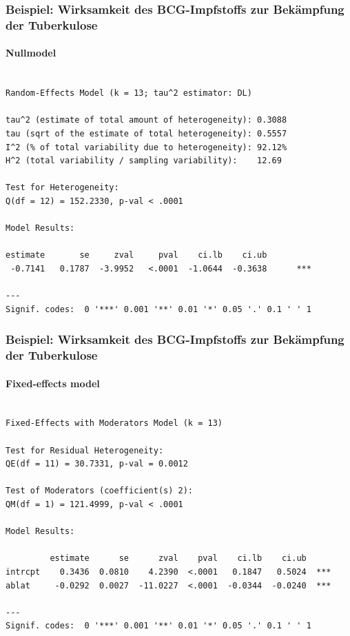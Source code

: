 \begin{frame}[fragile]
  \frametitle{Beispiel: Wirksamkeit des BCG-Impfstoffs zur Bekämpfung der
    Tuberkulose} \framesubtitle{Nullmodel}

\begin{tiny}
\begin{knitrout}
\color{fgcolor}\begin{kframe}
\begin{verbatim}

Random-Effects Model (k = 13; tau^2 estimator: DL)

tau^2 (estimate of total amount of heterogeneity): 0.3088
tau (sqrt of the estimate of total heterogeneity): 0.5557
I^2 (% of total variability due to heterogeneity): 92.12%
H^2 (total variability / sampling variability):    12.69

Test for Heterogeneity: 
Q(df = 12) = 152.2330, p-val < .0001

Model Results:

estimate       se     zval     pval    ci.lb    ci.ub          
 -0.7141   0.1787  -3.9952   <.0001  -1.0644  -0.3638      *** 

---
Signif. codes:  0 '***' 0.001 '**' 0.01 '*' 0.05 '.' 0.1 ' ' 1 
\end{verbatim}
\end{kframe}
\end{knitrout}

\end{tiny}
\end{frame}


\begin{frame}[fragile]
  \frametitle{Beispiel: Wirksamkeit des BCG-Impfstoffs zur Bekämpfung der
    Tuberkulose} \framesubtitle{Fixed-effects model}

\begin{tiny}
\begin{knitrout}
\color{fgcolor}\begin{kframe}
\begin{verbatim}

Fixed-Effects with Moderators Model (k = 13)

Test for Residual Heterogeneity: 
QE(df = 11) = 30.7331, p-val = 0.0012

Test of Moderators (coefficient(s) 2): 
QM(df = 1) = 121.4999, p-val < .0001

Model Results:

         estimate      se      zval    pval    ci.lb    ci.ub     
intrcpt    0.3436  0.0810    4.2390  <.0001   0.1847   0.5024  ***
ablat     -0.0292  0.0027  -11.0227  <.0001  -0.0344  -0.0240  ***

---
Signif. codes:  0 '***' 0.001 '**' 0.01 '*' 0.05 '.' 0.1 ' ' 1 
\end{verbatim}
\end{kframe}
\end{knitrout}

\end{tiny}
\end{frame}



